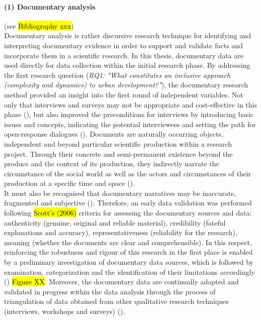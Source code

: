\documentclass[11pt]{report}
\begin{document}
\paragraph{(1) Documentary analysis} 
(see \hl{Bibliography xxx})
\\
Documentary analysis is rather discursive research technique for identifying and interpreting documentary evidence in order to support and validate facts and incorporate them in a scientific research. In this thesis, documentary data are used directly for data collection within the initial research phase. By addressing the first research question (\textit{RQ1: "What constitutes an inclusive approach (complexity and dynamics) to urban development?"}), the documentary research method provided an insight into the first round of independent variables. Not only that interviews and surveys may not be appropriate and cost-effective in this phase (\cite{(Mogalakwe 2006)}), but also improved the preconditions for interviews by introducing basic issues and concepts, indicating the potential interviewees and setting the path for open-response dialogues (\cite{(Robson, 1993; GRUBOVIC)}).
Documents are naturally occurring objects, independent and beyond particular scientific production within a research project. Through their concrete and semi-permanent existence beyond the produce and the context of its production, they indirectly narrate the circumstance of the social world as well as the actors and circumstances of their production at a specific time and space (\cite{((Jary and Jary 1991; Payne and Payne 2004; Mogalakwe 2006)}).
\\
It must also be recognised that documentary narratives may be inaccurate, fragmented and subjective (\cite{(Forster, 1994)}). 
Therefore, an early data validation was performed following \hl{Scott's (2006)} criteria for assessing the documentary sources and data: authenticity (genuine, original and reliable material), credibility (fateful explanations and accuracy), representativeness (reliability for the research), meaning (whether the documents are clear and comprehensible). In this respect, reinforcing the robustness and rigour of this research in the first place is enabled by a preliminary investigation of documentary data sources, which is followed by examination, categorization and the identification of their limitations accordingly (\cite{Scoot 2004}) \hl{Figure XX}. Moreover, the documentary data are continually adapted and validated in progress within the data analysis through the process of triangulation of data obtained from other qualitative research techniques (interviews, workshops and surveys) (\cite{(Cochrane, 1998;  Yin, 1994)}).
\end{document}
